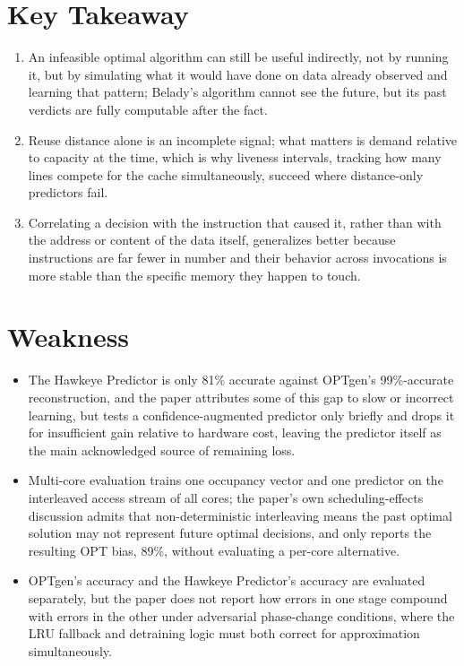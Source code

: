 \documentclass[10pt, conference]{IEEEtran}
\begin{document}
\section{Key Takeaway}
\begin{enumerate}[leftmargin=*, itemsep=2pt, topsep=2pt, parsep=1pt]
    \item An infeasible optimal algorithm can still be useful indirectly, not by running it, but by simulating what it would have done on data already observed and learning that pattern; Belady's algorithm cannot see the future, but its past verdicts are fully computable after the fact.
    \item Reuse distance alone is an incomplete signal; what matters is demand relative to capacity at the time, which is why liveness intervals, tracking how many lines compete for the cache simultaneously, succeed where distance-only predictors fail.
    \item Correlating a decision with the instruction that caused it, rather than with the address or content of the data itself, generalizes better because instructions are far fewer in number and their behavior across invocations is more stable than the specific memory they happen to touch.
\end{enumerate}

\section{Weakness}
\begin{itemize}[leftmargin=*, itemsep=2pt, topsep=2pt, parsep=1pt]
    \item The Hawkeye Predictor is only 81\% accurate against OPTgen's 99\%-accurate reconstruction, and the paper attributes some of this gap to slow or incorrect learning, but tests a confidence-augmented predictor only briefly and drops it for insufficient gain relative to hardware cost, leaving the predictor itself as the main acknowledged source of remaining loss.
    \item Multi-core evaluation trains one occupancy vector and one predictor on the interleaved access stream of all cores; the paper's own scheduling-effects discussion admits that non-deterministic interleaving means the past optimal solution may not represent future optimal decisions, and only reports the resulting OPT bias, 89\%, without evaluating a per-core alternative.
    \item OPTgen's accuracy and the Hawkeye Predictor's accuracy are evaluated separately, but the paper does not report how errors in one stage compound with errors in the other under adversarial phase-change conditions, where the LRU fallback and detraining logic must both correct for approximation simultaneously.
\end{itemize}
\end{document}
